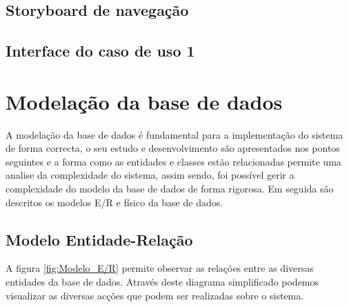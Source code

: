 \FloatBarrier\subsection{Storyboard de navegação}


\FloatBarrier\subsection{Interface do caso de uso 1}


\FloatBarrier\section{Modelação da base de dados}

A modelação da base de dados é fundamental para a implementação do sistema de forma correcta, o seu estudo e desenvolvimento são apresentados nos pontos seguintes e a forma como as entidades e classes estão relacionadas permite uma analise da complexidade do sistema, assim sendo, foi possível gerir a complexidade do modelo da base de dados de forma rigorosa. Em seguida são descritos os modelos E/R e físico da base de dados.

\FloatBarrier\subsection{Modelo Entidade-Relação}

A figura \ref{fig:Modelo_E/R} permite observar as relações entre as diversas entidades da base de dados. Através deste diagrama simplificado podemos visualizar as diversas acções que podem ser realizadas sobre o sistema.

